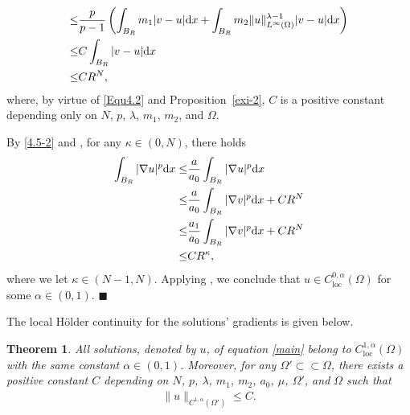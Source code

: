 \documentclass[onecolumn]{autart}
\newtheorem{theorem}{Theorem} %
\newenvironment{proof}{{\it Proof: \enspace}}{\hfill $\blacksquare$\par}
\begin{document}
\begin{proof}
\begin{align}
			\leq & \frac{p}{p-1} \left( \int_{B_R } m_1|v - u| \mathrm{d}x + \int_{B_R } m_2\|u\|_{L^\infty(\Omega)}^{\lambda-1}|v-u| \mathrm{d}x\right)  \notag\\
			\leq & C \int_{B_R } |v - u|\mathrm{d}x  \label{4.5-1}
			\\ \leq
			& C R^N \label{4.5-2},
		\end{align}
		where, by virtue of \eqref{Equ4.2} and Proposition~\ref{exi-2},   $C$ is a positive constant depending only on  $N$, $p$, $\lambda$, $m_1$, $m_2$, and $\Omega$.
		
		
		
		By \eqref{4.5-2} and \cite[Lemma A.14]{Zheng:2022}, for any $\kappa \in (0, N)$, there holds
		\begin{align*}
			\int_{B_R}  |\nabla u|^p \mathrm{d}x \leq&
			\frac{a}{a_0}\int_{B_R}  |\nabla u|^p \mathrm{d}x
			\notag\\
			\leq &\frac{a}{a_0}\int_{B_R}  |\nabla v|^p \mathrm{d}x  + C R^N
			\notag\\
			\leq & \frac{a_1}{a_0}\int_{B_R}  |\nabla v|^p \mathrm{d}x  + C R^N
			\notag\\
			\leq& C R^\kappa ,
		\end{align*}
		where we let $\kappa \in(N - 1 , N)$. Applying \cite[Lemma A.13]{Zheng:2022}, we conclude that $ u \in C^{0,\alpha}_{\mathrm{loc}}(\Omega) $ for some $ \alpha \in (0,1)$.
	\end{proof}
	
	The local H\"older continuity  for the solutions' gradients is given below.
	\begin{theorem}\label{C^1}
		All solutions, denoted by  $u$, of equation \eqref{main} belong to $C_{\mathrm{loc}}^{1, \alpha}(\Omega)$ with the same constant $\alpha \in (0, 1)$.  Moreover, for any $\Omega' \subset \subset \Omega$, there exists a positive constant $C$ depending on $N$, $p$, $\lambda$, $m_1$, $m_2$, $a_0$, $\mu$, $\Omega'$, and $\Omega$ such that
		\begin{align}
			\|u\|_{C^{1,\alpha}(\Omega')} \leq C. \label{Equ 4.5}
		\end{align}
	\end{theorem}
	
\end{document}
